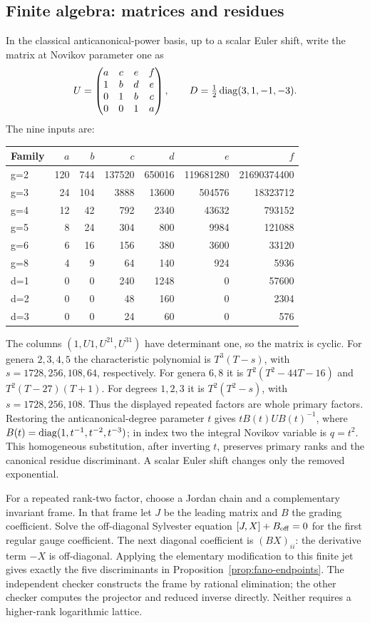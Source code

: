 \subsection{Finite algebra: matrices and residues}
In the classical anticanonical-power basis, up to a scalar Euler shift,
write the matrix at Novikov parameter one as
\[
 U=\begin{pmatrix}a&c&e&f\\1&b&d&e\\0&1&b&c\\0&0&1&a\end{pmatrix},
 \qquad D=\tfrac12\operatorname{diag}(3,1,-1,-3).
\]
The nine inputs are:
\begin{center}\small
\begin{tabular}{@{}lrrrrrr@{}}
\toprule
Family & $a$ & $b$ & $c$ & $d$ & $e$ & $f$\\\midrule
g=2 & 120&744&137520&650016&119681280&21690374400\\
g=3 & 24&104&3888&13600&504576&18323712\\
g=4 & 12&42&792&2340&43632&793152\\
g=5 & 8&24&304&800&9984&121088\\
g=6 & 6&16&156&380&3600&33120\\
g=8 & 4&9&64&140&924&5936\\
d=1 & 0&0&240&1248&0&57600\\
d=2 & 0&0&48&160&0&2304\\
d=3 & 0&0&24&60&0&576\\
\bottomrule
\end{tabular}
\end{center}
The columns $(1,U1,U^21,U^31)$ have determinant one, so the matrix is cyclic.
For genera $2,3,4,5$ the characteristic polynomial is $T^3(T-s)$, with
$s=1728,256,108,64$, respectively. For genera $6,8$ it is
$T^2(T^2-44T-16)$ and $T^2(T-27)(T+1)$.
For degrees $1,2,3$ it is $T^2(T^2-s)$, with $s=1728,256,108$.
Thus the displayed repeated factors are whole primary factors.
Restoring the anticanonical-degree parameter $t$ gives
$tB(t)UB(t)^{-1}$, where $B(t)=\operatorname{diag}(1,t^{-1},t^{-2},t^{-3})$;
in index two the integral Novikov variable is $q=t^2$.
This homogeneous substitution, after inverting $t$, preserves primary ranks
and the canonical residue discriminant. A scalar Euler shift changes only
the removed exponential.

For a repeated rank-two factor, choose a Jordan chain and a complementary
invariant frame. In that frame let $J$ be the leading matrix and $B$ the
grading coefficient. Solve the off-diagonal Sylvester equation
$[J,X]+B_{\rm off}=0$ for the first regular gauge coefficient.
The next diagonal coefficient is $(BX)_{ii}$: the derivative term $-X$
is off-diagonal. Applying the elementary modification to this finite jet
gives exactly the five discriminants in Proposition~\ref{prop:fano-endpoints}.
The independent checker constructs the frame by rational elimination;
the other checker computes the projector and reduced inverse directly.
Neither requires a higher-rank logarithmic lattice.

